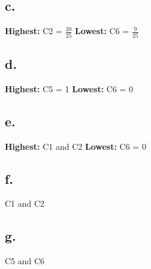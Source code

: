 \documentclass[letter]{article}
\theoremstyle{case}
\begin{document}
\subsection*{c. } 
\textbf{Highest:} C2 = $\frac{20}{25}$ \textbf{Lowest:} C6 = $\frac{9}{25}$ 
\subsection*{d. } 
\textbf{Highest:} C5 = 1 \textbf{Lowest:} C6 = 0 
\subsection*{e. } 
\textbf{Highest:} C1 and C2 \textbf{Lowest:} C6 = 0 
\subsection*{f. } 
C1 and C2
\subsection*{g. } 
C5 and C6
\end{document}
